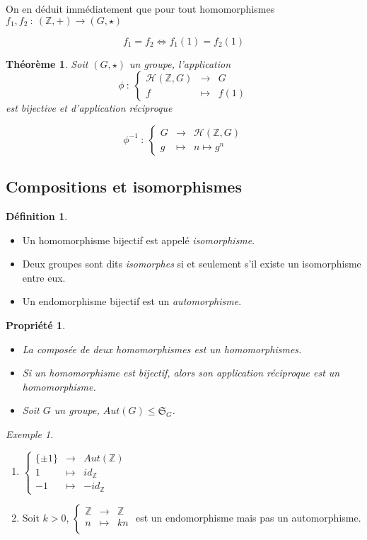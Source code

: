 \documentclass[]{article}
\newtheorem{mythm}{Théorème}
\newtheorem{myproperty}{Propriété}
\theoremstyle{remark}
\newtheorem{myexmpl}{Exemple}
\theoremstyle{definition}
\newtheorem{mydef}{Définition}
\newcommand{\func}[5]{
#1 ~ : ~ \left\{ \begin{array}{lcl}
	#2 & \longrightarrow & #3 \\
	#4 & \longmapsto & #5
\end{array}
\right.
}
\newcommand{\funcshort}[3]{
#1 ~ : ~ #2 \longrightarrow #3
}
\begin{document}
On en déduit immédiatement que pour tout homomorphismes $\funcshort{f_1, f_2}{(\mathbb{Z}, +)}{(G, \star)}$

$$f_1=f_2 \Longleftrightarrow f_1(1)=f_2(1)$$

\begin{mythm}
	Soit $(G, \star)$ un groupe, l'application
	$$
	\func{\phi}{\mathcal{H}(\mathbb{Z}, G)}{G}{f}{f(1)}
	$$
	est bijective et d'application réciproque
	
	$$
	\func{\phi^{-1}}{G}{\mathcal{H}(\mathbb{Z}, G)}{g}{n \longmapsto g^n}
	$$
\end{mythm}

\subsection{Compositions et isomorphismes}

\begin{mydef}
	\leavevmode
	\begin{itemize}
		\item Un homomorphisme bijectif est appelé \textit{isomorphisme}.
		\item Deux groupes sont dits \textit{isomorphes} si et seulement s'il existe un isomorphisme entre eux.
		\item Un endomorphisme bijectif est un \textit{automorphisme}.
	\end{itemize}
\end{mydef}

\begin{myproperty}
	\leavevmode
	\begin{itemize}
		\item La composée de deux homomorphismes est un homomorphismes.
		\item Si un homomorphisme est bijectif, alors son application réciproque est un homomorphisme.
		\item Soit $G$ un groupe, $Aut(G) \leqslant \mathfrak{S}_G$.
	\end{itemize}
\end{myproperty}

\begin{myexmpl}
	\leavevmode
	\begin{enumerate}
		\item
		$\left\{\begin{array}{rcl}
			\{\pm 1\} & \longrightarrow & Aut(\mathbb{Z}) \\
			1 & \longmapsto & id_{\mathbb{Z}} \\
			-1 & \longmapsto & -id_{\mathbb{Z}}
		\end{array}\right.$
	
	\item Soit $k > 0$, 
		$\left\{\begin{array}{rcl}
			\mathbb{Z} & \longrightarrow & \mathbb{Z} \\
			n & \longmapsto & kn \\
		\end{array}\right.$ est un endomorphisme mais pas un automorphisme.
	\end{enumerate}
\end{myexmpl}
\end{document}
